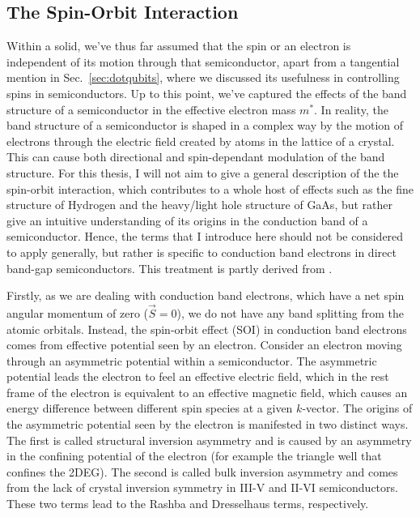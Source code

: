 \subsection{The Spin-Orbit Interaction}
\label{sec:SOI}
Within a solid, we've thus far assumed that the spin or an electron is independent of its motion through that semiconductor, apart from
a tangential mention in Sec.~\ref{sec:dotqubits}, where we discussed its usefulness in controlling spins in semiconductors. Up to this point, we've captured
the effects of the band structure of a semiconductor in the effective electron mass $m^*$. In reality, the band structure of a semiconductor is shaped
in a complex way by the motion of electrons through the electric field created by atoms in the lattice of a crystal. This can cause both directional
and spin-dependant modulation of the band structure. For this thesis, I will not aim to give a general description of
the the spin-orbit interaction, which contributes to a whole host of effects such as the fine structure of Hydrogen and the heavy/light hole structure of GaAs,
but rather give an intuitive understanding of its origins in the conduction band of a semiconductor. Hence, the terms that
I introduce here should not be considered to apply generally, but rather is specific to conduction band electrons in direct band-gap semiconductors.
This treatment is partly derived from \cite{winkler2003spin,dyakonov2017spin}.

Firstly, as we are dealing with conduction band electrons, which have a net spin angular momentum of
zero ($\vec S = 0$), we do not have any band splitting from the atomic orbitals. Instead, the spin-orbit effect (SOI) in conduction band electrons comes from effective
potential seen by an electron. Consider an electron moving through an asymmetric potential within a semiconductor. The asymmetric potential leads the
electron to feel an effective electric field, which in the rest frame of the electron is equivalent to an effective magnetic field, which causes an energy difference
between different spin species at a given $k$-vector. The origins of the asymmetric potential seen by the electron is manifested in two distinct ways. The first is called structural inversion asymmetry and is caused by an asymmetry in the confining potential of the electron (for example the triangle well that confines the 2DEG). The second is called bulk inversion asymmetry and comes from the lack of crystal inversion symmetry in III-V and II-VI semiconductors. These two terms lead to the Rashba and Dresselhaus terms, respectively.


